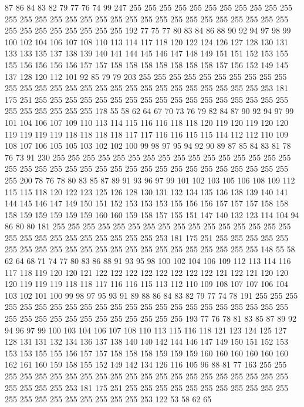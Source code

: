87 86 84 83 82 79 77 76 74 99 247 255 255 255 255 255 255 255 255 255
255 255 255 255 255 255 255 255 255 255 255 255 255 255 255 255 255 255 255 255
255 255 255 255 255 255 255 255 255 192 77 75 77 80 83 84 86 88 90 92
94 97 98 99 100 102 104 106 107 108 110 113 114 117 118 120 122 124 126 127
128 130 131 133 133 135 137 138 139 140 141 144 145 146 147 148 149 151 151 152
153 155 155 156 156 156 156 157 157 158 158 158 158 158 158 158 157 156 152 149
145 137 128 120 112 101 92 85 79 79 203 255 255 255 255 255 255 255 255 255
255 255 255 255 255 255 255 255 255 255 255 255 255 255 255 255 255 255 253 181
175 251 255 255 255 255 255 255 255 255 255 255 255 255 255 255 255 255 255 255
255 255 255 255 255 178 55 58 62 64 67 70 73 76 79 82 84 87 90 92
94 97 99 101 104 106 107 109 110 113 114 115 116 116 118 118 120 119 120 119
120 120 119 119 119 119 118 118 118 118 117 117 116 116 115 115 114 112 112 110
109 108 107 106 105 105 103 102 102 100 99 98 97 95 94 92 90 89 87 85
84 83 81 78 76 73 91 230 255 255 255 255 255 255 255 255 255 255 255 255
255 255 255 255 255 255 255 255 255 255 255 255 255 255 255 255 255 255 255 255
255 255 255 255 200 78 76 78 80 83 85 87 89 91 93 96 97 99 101 102
103 105 106 108 109 112 115 115 118 120 122 123 125 126 128 130 131 132 134 135
136 138 139 140 141 144 145 146 147 149 150 151 152 153 153 153 155 156 156 157
157 157 158 158 158 159 159 159 159 159 160 160 159 158 157 155 151 147 140 132
123 114 104 94 86 80 80 181 255 255 255 255 255 255 255 255 255 255 255 255
255 255 255 255 255 255 255 255 255 255 255 255 255 255 253 181 175 251 255 255
255 255 255 255 255 255 255 255 255 255 255 255 255 255 255 255 255 255 255 255
148 55 58 62 64 68 71 74 77 80 83 86 88 91 93 95 98 100 102 104
106 109 112 113 114 116 117 118 119 120 120 121 122 122 122 122 122 122 122 122
121 122 121 120 120 120 119 119 119 118 118 117 116 116 115 113 112 110 109 108
107 107 106 104 103 102 101 100 99 98 97 95 93 91 89 88 86 84 83 82
79 77 74 78 191 255 255 255 255 255 255 255 255 255 255 255 255 255 255 255
255 255 255 255 255 255 255 255 255 255 255 255 255 255 255 255 255 255 255 193
77 76 78 81 83 85 87 89 92 94 96 97 99 100 103 104 106 107 108 110
113 115 116 118 121 123 124 125 127 128 131 131 132 134 136 137 138 140 140 142
144 146 147 149 150 151 152 153 153 153 155 155 156 157 157 158 158 158 159 159
159 160 160 160 160 160 160 162 161 160 159 158 155 152 149 142 134 126 116 105
96 88 81 77 163 255 255 255 255 255 255 255 255 255 255 255 255 255 255 255
255 255 255 255 255 255 255 255 255 255 253 181 175 251 255 255 255 255 255 255
255 255 255 255 255 255 255 255 255 255 255 255 255 255 253 122 53 58 62 65
